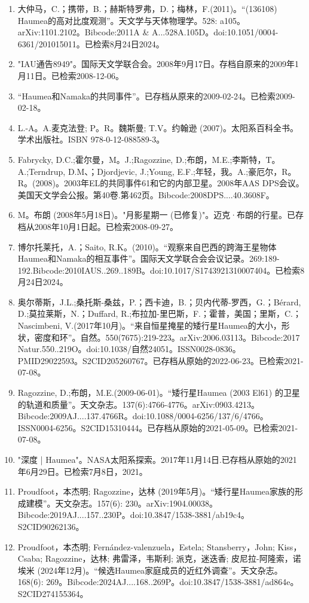 \begin{enumerate}
\item 大仲马，C.；携带，B.；赫斯特罗弗，D.；梅林，F.(2011)。“(136108) Haumea的高对比度观测”。天文学与天体物理学。528: a105。arXiv:1101.2102。Bibcode:2011A & A...528A.105D。doi:10.1051/0004-6361/201015011。已检索8月24日2024。
\item "IAU通告8949"。国际天文学联合会。2008年9月17日。存档自原来的2009年1月11日。已检索2008-12-06。
\item “Haumea和Namaka的共同事件”。已存档从原来的2009-02-24。已检索2009-02-18。
\item L.-A。A.麦克法登; P。R。魏斯曼; T.V。约翰逊 (2007)。太阳系百科全书。学术出版社。ISBN  978-0-12-088589-3。
\item Fabrycky, D.C.;霍尔曼，M。J.;Ragozzine, D.;布朗，M.E.;李斯特，T。A.;Terndrup, D.M、；Djordjevic, J.;Young, E.F.;年轻，我。A.;豪厄尔，R。R。(2008)。2003年EL的共同事件61和它的内部卫星。2008年AAS DPS会议。美国天文学会公报。第40卷.第462页。Bibcode:2008DPS....40.3608F。
\item M。布朗 (2008年5月18日)。"月影星期一 (已修复)"。迈克·布朗的行星。已存档从2008年10月1日起。已检索2008-09-27。
\item 博尔托莱托，A.；Saito, R.K。(2010)。“观察来自巴西的跨海王星物体Haumea和Namaka的相互事件”。国际天文学联合会会议记录。269:189-192.Bibcode:2010IAUS..269..189B。doi:10.1017/S1743921310007404。已检索8月24日2024。
\item 奥尔蒂斯，J.L.;桑托斯-桑兹，P.；西卡迪，B.；贝内代蒂-罗西，G.；Bérard, D.;莫拉莱斯，N.；Duffard, R.;布拉加-里巴斯，F.；霍普，美国；里斯，C.；Nascimbeni, V.(2017年10月)。“来自恒星掩星的矮行星Haumea的大小，形状，密度和环”。自然。550(7675):219-223。arXiv:2006.03113。Bibcode:2017 Natur.550..219O。doi:10.1038/自然24051。ISSN0028-0836。PMID29022593。S2CID205260767。已存档从原始的2022-06-23。已检索2021-07-08。   
\item Ragozzine, D.;布朗，M.E.(2009-06-01)。“矮行星Haumea (2003 El61) 的卫星的轨道和质量”。天文杂志。137(6):4766-4776。arXiv:0903.4213。Bibcode:2009AJ....137.4766R。doi:10.1088/0004-6256/137/6/4766。ISSN0004-6256。S2CID15310444。已存档从原始的2021-05-09。已检索2021-07-08。  
\item "深度 | Haumea"。NASA太阳系探索。2017年11月14日.已存档从原始的2021年6月29日。已检索7月8日，2021。
\item Proudfoot，本杰明; Ragozzine，达林 (2019年5月)。“矮行星Haumea家族的形成建模”。天文杂志。157(6): 230。arXiv:1904.00038。Bibcode:2019AJ....157..230P。doi:10.3847/1538-3881/ab19c4。S2CID90262136。 
\item Proudfoot，本杰明; Fernández-valenzuela，Estela; Stansberry，John; Kiss，Csaba; Ragozzine，达林; 弗雷泽，韦斯利; 派克，迷迭香; 皮尼拉-阿隆索，诺埃米 (2024年12月)。“候选Haumea家庭成员的近红外调查”。天文杂志。168(6): 269。Bibcode:2024AJ....168..269P。doi:10.3847/1538-3881/ad864e。S2CID274155364。 

\end{enumerate}
